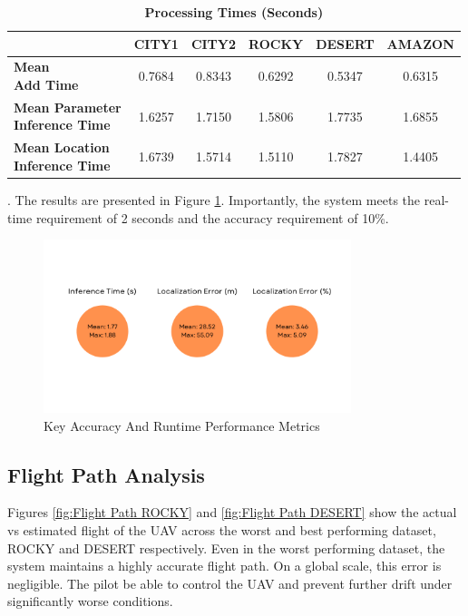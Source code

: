 \begin{table}[H]
\centering
\caption{\textbf{Processing Times (Seconds)}}
\label{tab:processing_times}
\begin{tabular}{|l|c|c|c|c|c|}
\hline
& \textbf{CITY1} & \textbf{CITY2} & \textbf{ROCKY} & \textbf{DESERT} & \textbf{AMAZON} \\
\hline
\makecell{\textbf{Mean} \\ \textbf{Add Time}} & 0.7684 & 0.8343 & 0.6292 & 0.5347 & 0.6315 \\
\hline
\makecell{\textbf{Mean Parameter} \\ \textbf{Inference Time}} & 1.6257 & 1.7150 & 1.5806 & 1.7735 & 1.6855 \\
\hline
\makecell{\textbf{Mean Location} \\ \textbf{Inference Time}} & 1.6739 & 1.5714 & 1.5110 & 1.7827 & 1.4405 \\
\hline
\end{tabular}
\end{table}





. The results are presented in Figure \ref{fig:Key Metrics}. Importantly, the system meets the real-time requirement of 2 seconds and the accuracy requirement of 10\%. 

\begin{figure}[H]
    \centering
    \includegraphics[width=0.8\textwidth]{./Chapter 5/RESULTPLOTS/Metrics_Raw.png}
    \caption{Key Accuracy And Runtime Performance Metrics}
    \label{fig:Key Metrics}
\end{figure}





\subsection{Flight Path Analysis}
Figures \ref{fig:Flight Path ROCKY} and \ref{fig:Flight Path DESERT} show the actual vs estimated flight of the UAV across the worst and best performing dataset, ROCKY and DESERT respectively. Even in the worst performing dataset, the system maintains a highly accurate flight path. On a global scale, this error is negligible. The pilot be able to control the UAV and prevent further drift under significantly worse conditions.


